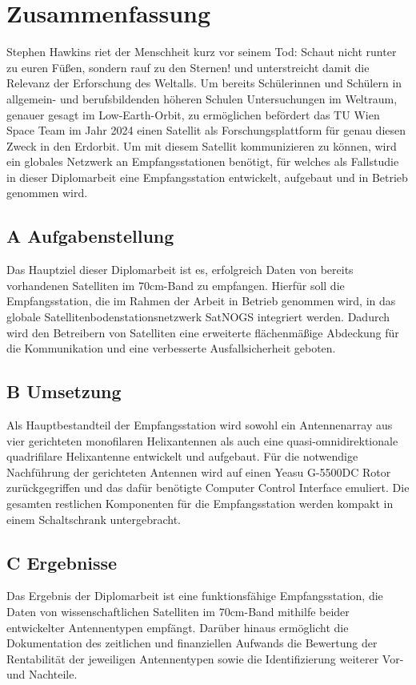 \section*{Zusammenfassung}
Stephen Hawkins riet der Menschheit kurz vor seinem Tod: \glqq Schaut nicht runter zu euren Füßen, sondern rauf zu den Sternen!\grqq{} und unterstreicht damit die Relevanz der Erforschung des Weltalls. Um bereits Schülerinnen und Schülern in allgemein- und berufsbildenden höheren Schulen Untersuchungen im Weltraum, genauer gesagt im Low-Earth-Orbit, zu ermöglichen befördert das TU Wien Space Team im Jahr 2024 einen Satellit als Forschungsplattform für genau diesen Zweck in den Erdorbit. Um mit diesem Satellit kommunizieren zu können, wird ein globales Netzwerk an Empfangsstationen benötigt, für welches als Fallstudie in dieser Diplomarbeit eine Empfangsstation entwickelt, aufgebaut und in Betrieb genommen wird. 

\subsection*{A Aufgabenstellung}
Das Hauptziel dieser Diplomarbeit ist es, erfolgreich Daten von bereits vorhandenen Satelliten im 70cm-Band zu empfangen. Hierfür soll die Empfangsstation, die im Rahmen der Arbeit in Betrieb genommen wird, in das globale Satellitenbodenstationsnetzwerk SatNOGS integriert werden. Dadurch wird den Betreibern von Satelliten eine erweiterte flächenmäßige Abdeckung für die Kommunikation und eine verbesserte Ausfallsicherheit geboten.

\subsection*{B Umsetzung}
Als Hauptbestandteil der Empfangsstation wird sowohl ein Antennenarray aus vier gerichteten monofilaren Helixantennen als auch eine quasi-omnidirektionale quadrifilare Helixantenne entwickelt und aufgebaut. Für die notwendige Nachführung der gerichteten Antennen wird auf einen Yeasu G-5500DC Rotor zurückgegriffen und das dafür benötigte Computer Control Interface emuliert. Die gesamten restlichen Komponenten für die Empfangsstation werden kompakt in einem Schaltschrank untergebracht.  

\subsection*{C Ergebnisse}
Das Ergebnis der Diplomarbeit ist eine funktionsfähige Empfangsstation, die Daten von wissenschaftlichen Satelliten im 70cm-Band mithilfe beider entwickelter Antennentypen empfängt. Darüber hinaus ermöglicht die Dokumentation des zeitlichen und finanziellen Aufwands die Bewertung der Rentabilität der jeweiligen Antennentypen sowie die Identifizierung weiterer Vor- und Nachteile.